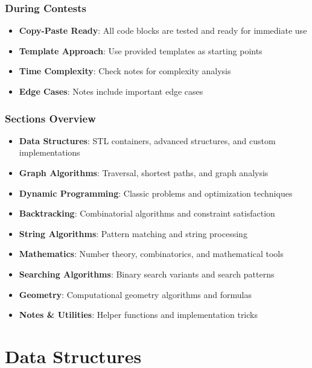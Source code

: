 \documentclass[11pt,a4paper]{article}
\begin{document}
\subsubsection*{During Contests}
\begin{itemize}
\item \textbf{Copy-Paste Ready}: All code blocks are tested and ready for immediate use
\item \textbf{Template Approach}: Use provided templates as starting points
\item \textbf{Time Complexity}: Check notes for complexity analysis
\item \textbf{Edge Cases}: Notes include important edge cases
\end{itemize}

\subsubsection*{Sections Overview}
\begin{itemize}
\item \textbf{Data Structures}: STL containers, advanced structures, and custom implementations
\item \textbf{Graph Algorithms}: Traversal, shortest paths, and graph analysis
\item \textbf{Dynamic Programming}: Classic problems and optimization techniques
\item \textbf{Backtracking}: Combinatorial algorithms and constraint satisfaction
\item \textbf{String Algorithms}: Pattern matching and string processing
\item \textbf{Mathematics}: Number theory, combinatorics, and mathematical tools
\item \textbf{Searching Algorithms}: Binary search variants and search patterns
\item \textbf{Geometry}: Computational geometry algorithms and formulas
\item \textbf{Notes \& Utilities}: Helper functions and implementation tricks
\end{itemize}



\vspace{1cm}

\newpage

\section{Data Structures}
\end{document}
